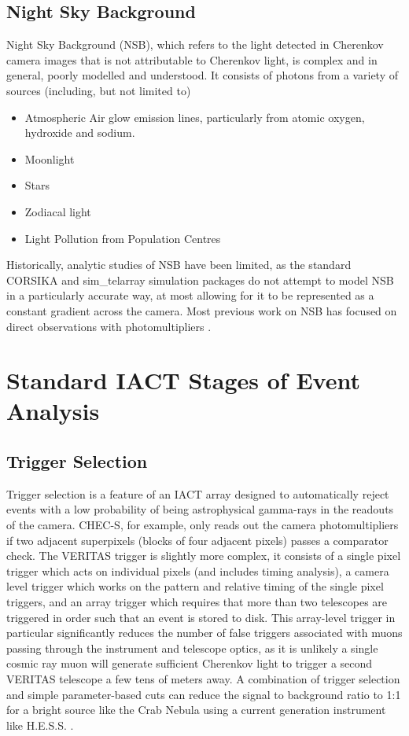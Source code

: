 \subsection{Night Sky Background}
Night Sky Background (NSB), which refers to the light detected in Cherenkov camera images that is not attributable to Cherenkov light, is complex and in general, poorly modelled and understood. It consists of photons from a variety of sources (including, but not limited to)

\begin{itemize}
    \item Atmospheric Air glow emission lines, particularly from atomic oxygen, hydroxide and sodium.
    \item Moonlight
    \item Stars
    \item Zodiacal light
    \item Light Pollution from Population Centres
\end{itemize}

Historically, analytic studies of NSB have been limited, as the standard CORSIKA and sim\_telarray simulation packages do not attempt to model NSB in a particularly accurate way, at most allowing for it to be represented as a constant gradient across the camera. Most previous work on NSB has focused on direct observations with photomultipliers \cite{BandE}. 

\section{Standard IACT Stages of Event Analysis}\label{app:imaging}

\subsection{Trigger Selection}

Trigger selection is a feature of an IACT array designed to automatically reject events with a low probability of being astrophysical gamma-rays in the readouts of the camera. CHEC-S, for example, only reads out the camera photomultipliers if two adjacent superpixels (blocks of four adjacent pixels) passes a comparator check. The VERITAS trigger is slightly more complex, it consists of a single pixel trigger which acts on individual pixels (and includes timing analysis), a camera level trigger which works on the pattern and relative timing of the single pixel triggers, and an array trigger which requires that more than two telescopes are triggered in order such that an event is stored to disk\cite{veritastrigger}. This array-level trigger in particular significantly reduces the number of false triggers associated with muons passing through the instrument and telescope optics, as it is unlikely a single cosmic ray muon will generate sufficient Cherenkov light to trigger a second VERITAS telescope a few tens of meters away. A combination of trigger selection and simple parameter-based cuts can reduce the signal to background ratio to 1:1 for a bright source like the Crab Nebula using a current generation instrument like H.E.S.S. \cite{Berge07}.

